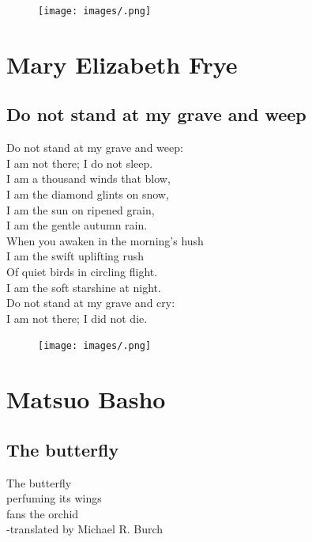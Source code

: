 \documentclass[]{book}
\renewenvironment{quote}{\begin{VF}}{\end{VF}}
\begin{document}
\begin{figure}[htbp]
\centering
\texttt{[image: images/.png]}
\caption{}
\end{figure}

\chapter{Mary Elizabeth Frye}\label{mary-elizabeth-frye}

\section{Do not stand at my grave and
weep}\label{do-not-stand-at-my-grave-and-weep}

\begin{quote}
Do not stand at my grave and weep:\\
I am not there; I do not sleep.\\
I am a thousand winds that blow,\\
I am the diamond glints on snow,\\
I am the sun on ripened grain,\\
I am the gentle autumn rain.\\
When you awaken in the morning's hush\\
I am the swift uplifting rush\\
Of quiet birds in circling flight.\\
I am the soft starshine at night.\\
Do not stand at my grave and cry:\\
I am not there; I did not die.
\end{quote}

\begin{figure}[htbp]
\centering
\texttt{[image: images/.png]}
\caption{}
\end{figure}

\chapter{Matsuo Basho}\label{matsuo-basho}

\section{The butterfly}\label{the-butterfly}

\begin{quote}
The butterfly\\
perfuming its wings\\
fans the orchid\\
-translated by Michael R. Burch
\end{quote}
\end{document}
